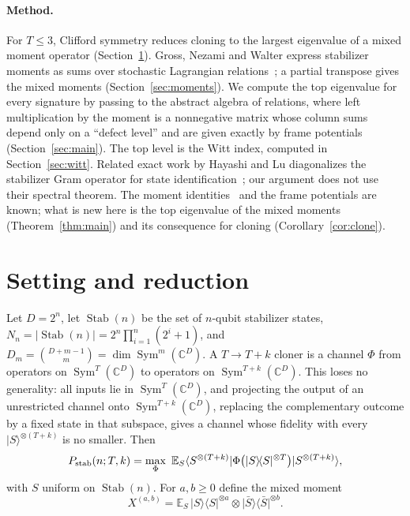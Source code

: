 \documentclass[11pt]{article}
\newcommand{\C}{\mathbb{C}}
\newcommand{\E}{\mathbb{E}}
\newcommand{\Sym}{\operatorname{Sym}}
\newcommand{\Stab}{\operatorname{Stab}}
\newcommand{\ket}[1]{\lvert #1\rangle}
\newcommand{\bra}[1]{\langle #1\rvert}
\theoremstyle{definition}
\theoremstyle{remark}
\begin{document}
\paragraph{Method.} For $T\le3$, Clifford symmetry reduces cloning to the largest eigenvalue of a mixed moment
operator (Section~\ref{sec:reduction}). Gross, Nezami and Walter express stabilizer moments as sums over stochastic
Lagrangian relations~\cite{GNW2021}; a partial transpose gives the mixed moments (Section~\ref{sec:moments}). We
compute the top eigenvalue for every signature by passing to the abstract algebra of relations, where left
multiplication by the moment is a nonnegative matrix whose column sums depend only on a ``defect level'' and are
given exactly by frame potentials (Section~\ref{sec:main}). The top level is the Witt index, computed in
Section~\ref{sec:witt}. Related exact work by Hayashi and Lu diagonalizes the stabilizer Gram operator for state
identification~\cite{HayashiLu2026}; our argument does not use their spectral theorem. The
moment identities~\cite{GNW2021}\cite[Lemma~6]{HayashiLu2026} and the frame potentials are known; what is new here
is the top eigenvalue of the mixed moments (Theorem~\ref{thm:main}) and its consequence for cloning
(Corollary~\ref{cor:clone}).

\section{Setting and reduction}\label{sec:reduction}
Let $D=2^n$, let $\Stab(n)$ be the set of $n$-qubit stabilizer states, $N_n=|\Stab(n)|=2^n\prod_{i=1}^n(2^i+1)$, and
$D_m=\binom{D+m-1}{m}=\dim\Sym^m(\C^D)$. A $T\to T+k$ cloner is a channel $\Phi$ from operators on
$\Sym^T(\C^D)$ to operators on $\Sym^{T+k}(\C^D)$. This loses no generality: all inputs lie in $\Sym^T(\C^D)$,
and projecting the output of an unrestricted channel onto $\Sym^{T+k}(\C^D)$, replacing the complementary outcome by
a fixed state in that subspace, gives a channel whose fidelity with every $\ket S^{\otimes(T+k)}$ is no smaller. Then
\[
P_{\rm stab}(n;T,k)=\max_\Phi\ \E_{S}\bra{S^{\otimes(T+k)}}\Phi\big(\ket S\!\bra S^{\otimes T}\big)\ket{S^{\otimes(T+k)}},
\]
with $S$ uniform on $\Stab(n)$. For $a,b\ge0$ define the mixed moment
\[
X^{(a,b)}=\E_S\,\ket S\!\bra S^{\otimes a}\otimes\ket{\bar S}\!\bra{\bar S}^{\otimes b}.
\]
\end{document}
